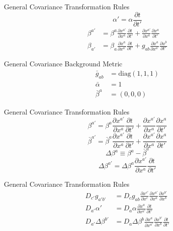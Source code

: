 \documentclass[xcolor=dvipsnames]{beamer}
\begin{document}
	\begin{frame}{General Covariance}
		Transformation Rules
			\[
				\alpha' = \alpha \frac{\partial t}{\partial t'}
			\]
			\pause
			\begin{align*}
				\beta^{a'} &= \beta^{a}\frac{\partial x^{a'}}{\partial x^{a}}\frac{\partial t}{\partial t'} + \frac{\partial x^{a'}}{\partial x^{a}}\frac{\partial x^{a}}{\partial t'}\\
				\beta_{a'} &= \beta_{a}\frac{\partial x^{a}}{\partial x^{a'}}\frac{\partial t}{\partial t'} + g_{ab}\frac{\partial x^{a}}{\partial x^{a'}}\frac{\partial x^{b}}{\partial t'}				
			\end{align*}
	\end{frame}
	\begin{frame}{General Covariance}
		Background Metric
		\pause
		\begin{align*}
		{\bar g}_{ab} &= \text{diag}(1, 1, 1)\\
		{\bar \alpha} &= 1\\
		{\bar \beta}^{a} &= (0, 0, 0)
		\end{align*}
	\end{frame}
	\begin{frame}{General Covariance}
		Transformation Rules
		\[
		\beta^{a'} = \beta^{a}\frac{\partial x^{a'}}{\partial x^{a}}\frac{\partial t}{\partial t'} + \frac{\partial x^{a'}}{\partial x^{a}}\frac{\partial x^{a}}{\partial t'}
		\]
		\pause
		\[
		{\bar \beta}^{a'} = {\bar \beta}^{a}\frac{\partial x^{a'}}{\partial x^{a}}\frac{\partial t}{\partial t'} + \frac{\partial x^{a'}}{\partial x^{a}}\frac{\partial x^{a}}{\partial t'}
		\]
		\pause
		\[
		\Delta \beta^{a} \equiv \beta^{a} - {\bar \beta}^{a}
		\]
		\pause
		\[
		\Delta \beta^{a'} = \Delta\beta^{a}\frac{\partial x^{a'}}{\partial x^{a}}\frac{\partial t}{\partial t'}
		\]
	\end{frame}
	\begin{frame}{General Covariance}
		Transformation Rules
		\begin{align*}
			D_{c'}g_{a'b'} &= D_{c}g_{ab}\frac{\partial x^{c'}}{\partial x^{c}}\frac{\partial x^{a'}}{\partial x^{a}}\frac{\partial x^{b'}}{\partial x^{b}}\\
		D_{a'}\alpha' &= D_{a}\alpha\frac{\partial x^{a}}{\partial x^{a'}}\frac{\partial t}{\partial t'}\\
		D_{a'}\Delta\beta^{b'} &= D_{a}\Delta\beta^{b}\frac{\partial x^{a}}{\partial x^{a'}}\frac{\partial x^{b'}}{\partial x^{b}}\frac{\partial t}{\partial t'}	
		\end{align*}
	\end{frame}
\end{document}

